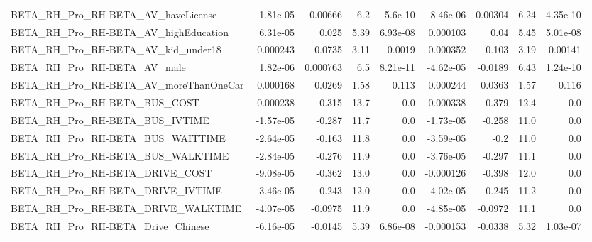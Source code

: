 \begin{tabular}{lrrrrrrrr}
BETA\_RH\_Pro\_RH-BETA\_AV\_haveLicense                 &    1.81e-05 &      0.00666 &      6.2 &  5.6e-10 &   8.46e-06 &     0.00304 &         6.24 &      4.35e-10 \\
BETA\_RH\_Pro\_RH-BETA\_AV\_highEducation               &    6.31e-05 &        0.025 &     5.39 & 6.93e-08 &   0.000103 &        0.04 &         5.45 &      5.01e-08 \\
BETA\_RH\_Pro\_RH-BETA\_AV\_kid\_under18                 &    0.000243 &       0.0735 &     3.11 &   0.0019 &   0.000352 &       0.103 &         3.19 &       0.00141 \\
BETA\_RH\_Pro\_RH-BETA\_AV\_male                        &    1.82e-06 &     0.000763 &      6.5 & 8.21e-11 &  -4.62e-05 &     -0.0189 &         6.43 &      1.24e-10 \\
BETA\_RH\_Pro\_RH-BETA\_AV\_moreThanOneCar              &    0.000168 &       0.0269 &     1.58 &    0.113 &   0.000244 &      0.0363 &         1.57 &         0.116 \\
BETA\_RH\_Pro\_RH-BETA\_BUS\_COST                       &   -0.000238 &       -0.315 &     13.7 &      0.0 &  -0.000338 &      -0.379 &         12.4 &           0.0 \\
BETA\_RH\_Pro\_RH-BETA\_BUS\_IVTIME                     &   -1.57e-05 &       -0.287 &     11.7 &      0.0 &  -1.73e-05 &      -0.258 &         11.0 &           0.0 \\
BETA\_RH\_Pro\_RH-BETA\_BUS\_WAITTIME                   &   -2.64e-05 &       -0.163 &     11.8 &      0.0 &  -3.59e-05 &        -0.2 &         11.0 &           0.0 \\
BETA\_RH\_Pro\_RH-BETA\_BUS\_WALKTIME                   &   -2.84e-05 &       -0.276 &     11.9 &      0.0 &  -3.76e-05 &      -0.297 &         11.1 &           0.0 \\
BETA\_RH\_Pro\_RH-BETA\_DRIVE\_COST                     &   -9.08e-05 &       -0.362 &     13.0 &      0.0 &  -0.000126 &      -0.398 &         12.0 &           0.0 \\
BETA\_RH\_Pro\_RH-BETA\_DRIVE\_IVTIME                   &   -3.46e-05 &       -0.243 &     12.0 &      0.0 &  -4.02e-05 &      -0.245 &         11.2 &           0.0 \\
BETA\_RH\_Pro\_RH-BETA\_DRIVE\_WALKTIME                 &   -4.07e-05 &      -0.0975 &     11.9 &      0.0 &  -4.85e-05 &     -0.0972 &         11.1 &           0.0 \\
BETA\_RH\_Pro\_RH-BETA\_Drive\_Chinese                  &   -6.16e-05 &      -0.0145 &     5.39 & 6.86e-08 &  -0.000153 &     -0.0338 &         5.32 &      1.03e-07 \\

\end{tabular}
